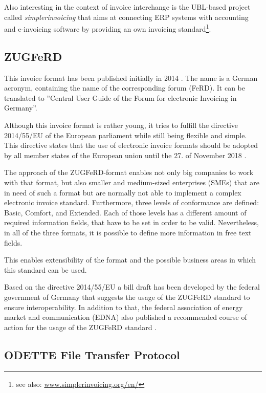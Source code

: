 Also interesting in the context of invoice interchange is the UBL-based project called \emph{simplerinvoicing} that aims at connecting ERP systems with accounting and e-invoicing software by providing an own invoicing standard\footnote {see also: \url{www.simplerinvoicing.org/en/}}. 

\subsection{ZUGFeRD}
\label{sec2.1.4}

This invoice format has been published initially in 2014 \cite{Ferd14}. The name is a German acronym, containing the name of the corresponding forum (FeRD). It can be translated to ''Central User Guide of the Forum for electronic Invoicing in Germany''. 

Although this invoice format is rather young, it tries to fulfill the directive 2014/55/EU of the European parliament \cite{eu14} while still being flexible and simple. This directive states that the use of electronic invoice formats should be adopted by all member states of the European union until the 27. of November 2018 \cite[article 11]{eu14}. 
 
The approach of the ZUGFeRD-format enables not only big companies to work with that format, but also smaller and medium-sized enterprises (SMEs) that are in need of such a format but are normally not able to implement a complex electronic invoice standard. 
Furthermore, three levels of conformance are defined: Basic, Comfort, and Extended. Each of those levels has a different amount of required information fields, that have to be set in order to be valid. Nevertheless, in all of the three formats, it is possible to define more information in free text fields. 

This enables extensibility of the format and the possible business areas in which this standard can be used.

Based on the directive 2014/55/EU \cite{eu14} a bill draft has been developed by the federal government of Germany \cite[page 10]{br16} that suggests the usage of the ZUGFeRD standard to ensure interoperability. In addition to that, the federal association of energy market and communication (EDNA) also published a recommended course of action for the usage of the ZUGFeRD standard \cite{edna16}.

\subsection{ODETTE File Transfer Protocol}
\label{sec2.1.5}

